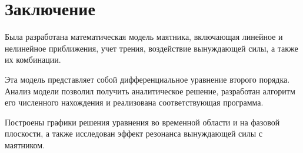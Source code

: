 \chapter{Заключение}
Была разработана математическая модель маятника, включающая линейное и нелинейное приближения, учет трения, воздействие вынуждающей силы, а также их комбинации. 

Эта модель представляет собой дифференциальное уравнение второго порядка. Анализ модели позволил получить аналитическое решение, разработан алгоритм его численного нахождения и реализована соответствующая программа. 

Построены графики решения уравнения во временной области и на фазовой плоскости, а также исследован эффект резонанса вынуждающей силы с маятником.
